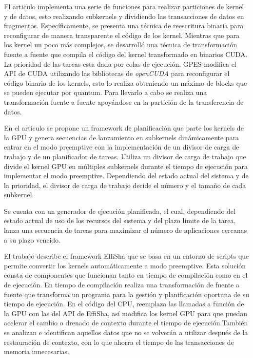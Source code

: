 El articulo \cite{GPES} implementa una serie de funciones para realizar particiones de kernel y de datos, esto realizando subkernels y dividiendo las transacciones de datos en fragmentos. 
Específicamente, se presenta una técnica de reescritura binaria para reconfigurar de manera transparente el código de los kernel. Mientras que para los kernel un poco más complejos, se desarrolló una técnica de transformación fuente a fuente que compila el código del kernel transformado en binarios CUDA. La prioridad de las tareas esta dada por colas de ejecución. GPES modifica el API de CUDA utilizando las bibliotecas de  \textit{openCUDA} para reconfigurar el código binario de los kernels, esto lo realiza obteniendo un máximo de blocks que se pueden ejecutar por quantum. Para llevarlo a cabo se realiza una transformación fuente a fuente apoyándose en la partición de la transferencia de datos.
\newline

En el artículo \cite{RTFG} se propone un framework de planificación que parte los kernels de la GPU y genera secuencias de lanzamiento en subkernels dinámicamente para entrar en el modo preemptive con la implementación de un divisor de carga de trabajo y de un planificador de tareas. 
Utiliza un divisor de carga de trabajo que divide el kernel GPU en múltiples subkernels durante el tiempo de ejecución para implementar el modo preemptive. Dependiendo del estado actual del sistema y de la prioridad, el divisor de carga de trabajo decide el número y el tamaño de cada subkernel. 
\newline

Se cuenta con un generador de ejecución planificada, el cual, dependiendo del estado actual de uso de los recursos del sistema y del plazo límite de la tarea, lanza una secuencia de tareas para maximizar el número de aplicaciones cercanas a su plazo vencido.	
\newline

El trabajo \cite{Effisha} describe el framework EffiSha que se basa en un entorno de scripts que permite convertir los kernels automáticamente a modo preemptive. Esta solución consta de componentes que funcionan tanto en tiempo de compilación como en el de ejecución. 
En tiempo de compilación realiza una transformación de fuente a fuente que transforma un programa para la gestión y planificación oportuna de su tiempo de ejecución.
En el código del CPU, reemplaza las llamadas a función de la GPU con las del API de EffiSha, así modifica los kernel GPU para que puedan acelerar el cambio o drenado de contexto durante el tiempo de ejecución.También se analizan e identifican aquellos datos que no se volverán a utilizar después de la restauración de contexto, con lo que ahorra el tiempo de las transacciones de memoria innecesarias.
\newline

